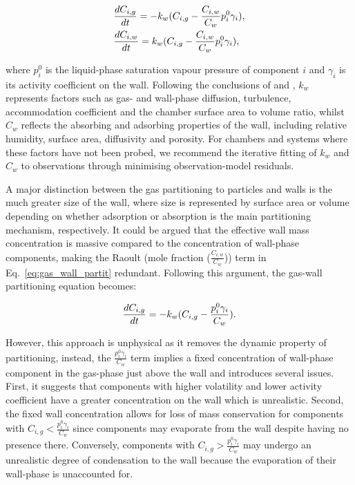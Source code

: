 \documentclass[gmd, manuscript]{copernicus}
\begin{document}
\begin{align} \label{eq:gas_wall_partit}
	&\frac{dC_{i,g}}{dt} = -k_{w}(C_{i,g}-\frac{C_{i,w}}{C_{w}}p^{0}_{i}\gamma_{i})\rm{,}\\
	&\frac{dC_{i,w}}{dt} = k_{w}(C_{i,g}-\frac{C_{i,w}}{C_{w}}p^{0}_{i}\gamma_{i})\rm{,}
\end{align}

where $p^{0}_{i}$ is the liquid-phase saturation vapour pressure of component $i$ and $\gamma_{i}$ is its activity coefficient on the wall.  Following the conclusions of \citet{Matsunaga2010} and \citet{Zhang2015b}, $k_{w}$ represents factors such as gas- and wall-phase diffusion, turbulence, accommodation coefficient and the chamber surface area to volume ratio, whilst $C_{w}$ reflects the absorbing and adsorbing properties of the wall, including relative humidity, surface area, diffusivity and porosity.  For chambers and systems where these factors have not been probed, we recommend the iterative fitting of $k_{w}$ and $C_{w}$ to observations through minimising observation-model residuals.

A major distinction between the gas partitioning to particles and walls is the much greater size of the wall, where size is represented by surface area or volume depending on whether adsorption or absorption is the main partitioning mechanism, respectively.  It could be argued that the effective wall mass concentration is massive compared to the concentration of wall-phase components, making the Raoult (mole fraction ($\frac{C_{i,w}}{C_{w}}$)) term in Eq.~\ref{eq:gas_wall_partit} redundant.  Following this argument, the gas-wall partitioning equation becomes:

\begin{equation} \label{eq:gas_wall_partit2}
\frac{dC_{i,g}}{dt} = -k_{w}(C_{i,g}-\frac{p^{0}_{i}\gamma_{i}}{C_{w}})\rm{.}
\end{equation}

However, this approach is unphysical as it removes the dynamic property of partitioning, instead, the $\frac{p^{0}_{i}\gamma_{i}}{C_{w}}$ term implies a fixed concentration of wall-phase component in the gas-phase just above the wall and introduces several issues.  First, it suggests that components with higher volatility and lower activity coefficient have a greater concentration on the wall which is unrealistic.  Second, the fixed wall concentration allows for loss of mass conservation for components with $C_{i,g}<\frac{p^{0}_{i}\gamma_{i}}{C_{w}}$ since components may evaporate from the wall despite having no presence there.  Conversely, components with  $C_{i,g}>\frac{p^{0}_{i}\gamma_{i}}{C_{w}}$ may undergo an unrealistic degree of condensation to the wall because the evaporation of their wall-phase is unaccounted for.
\end{document}

